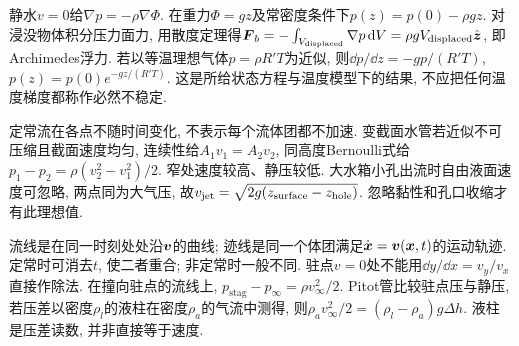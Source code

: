 静水$v=0$给$\nabla p=-\rho\nabla\Phi$. 在重力$\Phi=gz$及常密度条件下$p(z)=p(0)-\rho gz$. 对浸没物体积分压力面力, 用散度定理得$\boldsymbol{F}_b=-\int_{V_{\rm displaced}}\nabla p\,\mathrm d V=\rho gV_{\rm displaced}\hat{\boldsymbol{z}}$, 即Archimedes浮力. 若以等温理想气体$p=\rho R'T$为近似, 则$\dd p/\dd z=-gp/(R'T)$, $p(z)=p(0)e^{-gz/(R'T)}$. 这是所给状态方程与温度模型下的结果, 不应把任何温度梯度都称作必然不稳定.

定常流在各点不随时间变化, 不表示每个流体团都不加速. 变截面水管若近似不可压缩且截面速度均匀, 连续性给$A_1v_1=A_2v_2$, 同高度Bernoulli式给$p_1-p_2=\rho(v_2^2-v_1^2)/2$. 窄处速度较高、静压较低. 大水箱小孔出流时自由液面速度可忽略, 两点同为大气压, 故$v_{\rm jet}=\sqrt{2g(z_{\mathrm{surface}}-z_{\mathrm{hole}})}$. 忽略黏性和孔口收缩才有此理想值.

流线是在同一时刻处处沿$\boldsymbol{v}$的曲线; 迹线是同一个体团满足$\dot{\boldsymbol{x}}=\boldsymbol{v}(\boldsymbol{x},t)$的运动轨迹. 定常时可消去$t$, 使二者重合; 非定常时一般不同. 驻点$v=0$处不能用$\dd y/\dd x=v_y/v_x$直接作除法. 在撞向驻点的流线上, $p_{\mathrm{stag}}-p_\infty=\rho v_\infty^2/2$. Pitot管比较驻点压与静压, 若压差以密度$\rho_l$的液柱在密度$\rho_a$的气流中测得, 则$\rho_av_\infty^2/2=(\rho_l-\rho_a)g\Delta h$. 液柱是压差读数, 并非直接等于速度.
